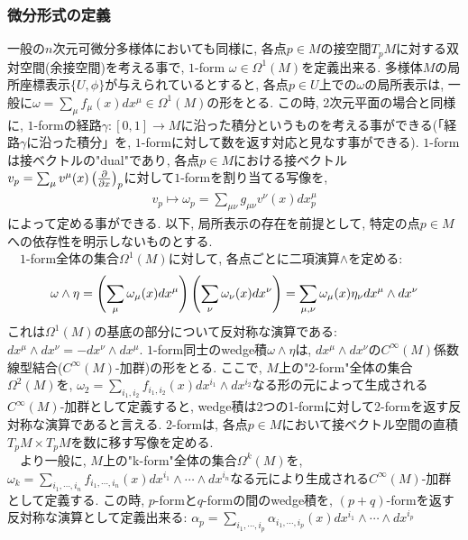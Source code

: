 \subsubsection{微分形式の定義}
一般の$n$次元可微分多様体においても同様に, 各点$p\in M$の接空間$T_pM$に対する双対空間(余接空間)を考える事で, 
$1$-form $\omega\in \Omega^{1}(M)$を定義出来る. 
多様体$M$の局所座標表示$\{U, \phi\}$が与えられているとすると, 各点$p\in U$上での$\omega$の局所表示は, 一般に$\omega=\sum_{\mu}f_{\mu}(x)dx^{\mu}\in \Omega^{1}(M)$の形をとる. 
この時, 2次元平面の場合と同様に, $1$-formの経路$\gamma: [0,1]\to M$に沿った積分というものを考える事ができる(「経路$\gamma$に沿った積分」を, $1$-formに対して数を返す対応と見なす事ができる). 
$1$-formは接ベクトルの"dual"であり, 各点$p\in M$における接ベクトル$v_p=\sum_{\mu}v^{\mu}(x)\left({\frac{\partial
}{\partial x}}\right)_p$に対して$1$-formを割り当てる写像を, 
\begin{align}
    v_p \mapsto \omega_p = \sum_{\mu\nu}g_{\mu\nu}v^{\nu}(x)dx^{\mu}_p
\end{align}
によって定める事ができる. 
以下, 局所表示の存在を前提として, 特定の点$p\in M$への依存性を明示しないものとする. \\
　$1$-form全体の集合$\Omega^{1}(M)$に対して, 各点ごとに二項演算$\wedge$を定める: 
\begin{align}
    \omega\wedge \eta = \left({\sum_{\mu}\omega_\mu(x)dx^{\mu}}\right)\left({\sum_{\nu}\omega_\nu(x)dx^\nu}\right)
    =\sum_{\mu, \nu}\omega_{\mu}(x)\eta_{\nu} dx^{\mu}\wedge dx^{\nu}
\end{align}
これは$\Omega^{1}(M)$の基底の部分について反対称な演算である: $dx^{\mu}\wedge dx^\nu = -dx^\nu \wedge dx^\mu$. 
$1$-form同士のwedge積$\omega\wedge \eta$は, $dx^{\mu}\wedge dx^\nu$の$C^{\infty}(M)$係数線型結合($C^{\infty}(M)$-加群)の形をとる. 
ここで, $M$上の"2-form"全体の集合$\Omega^{2}(M)$を, $\omega_2 = \sum_{i_1, i_2}f_{i_1, i_2}(x)dx^{i_1}\wedge dx^{i_2}$なる形の元によって生成される$C^{\infty}(M)$-加群として定義すると, 
wedge積は2つの1-formに対して2-formを返す反対称な演算であると言える. 
2-formは, 各点$p\in M$において接ベクトル空間の直積$T_pM\times T_p M$を数に移す写像を定める. \\
　より一般に, $M$上の"k-form"全体の集合$\Omega^{k}(M)$を, $\omega_k = \sum_{i_1, \cdots, i_n}f_{i_1, \cdots, i_n}(x)dx^{i_1}\wedge \cdots \wedge dx^{i_n}$なる元により生成される$C^{\infty}(M)$-加群として定義する. 
この時, $p$-formと$q$-formの間のwedge積を, $(p+q)$-formを返す反対称な演算として定義出来る: 
$\alpha_p = \sum_{i_1, \cdots, i_p}\alpha_{i_1, \cdots, i_p}(x)dx^{i_1}\wedge \cdots \wedge dx^{i_p}$
